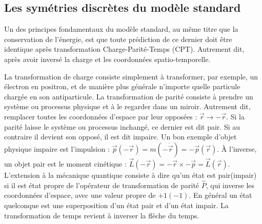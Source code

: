		\subsection{Les symétries discrètes du modèle standard}\label{sec::CP}
		
			Un des principes fondamentaux du modèle standard, au même titre que la conservation de l'énergie, est que toute prédiction de ce dernier doit être identique après transformation Charge-Parité-Temps (CPT). Autrement dit, après avoir inversé la charge et les coordonnées spatio-temporelle.
			
			La transformation de charge consiste simplement à transformer, par exemple, un électron en positron, et de manière plus générale n'importe quelle particule chargée en son antiparticule. La transformation de parité consiste à prendre un système ou processus physique  et à le regarder dans un miroir. Autrement dit, remplacer toutes les coordonnées d'espace par leur opposées : $\Vec{r}\to-\Vec{r}$. Si la parité laisse le système ou processus inchangé, ce dernier est dit pair. Si au contraire il devient son opposé, il est dit impaire. Un bon exemple d'objet physique impaire est l'impulsion : $\Vec{p}(-\Vec{r}) = m(-\dot{\Vec{r}}) = -\Vec{p}(\Vec{r})$. À l'inverse, un objet pair est le moment cinétique : $\Vec{L}(-\Vec{r}) = -\Vec{r}\times -\Vec{p} = \Vec{L}(\Vec{r})$. L'extension à la mécanique quantique consiste à dire qu'un état est pair(impair) si il est état propre de l'opérateur de transformation de parité $\hat{P}$, qui inverse les coordonnées d'espace, avec une valeur propre de $+1(-1)$. En général un état quelconque est une superposition d'un état pair et d'un état impair. La transformation de temps revient à inverser la flèche du temps.
			
			

